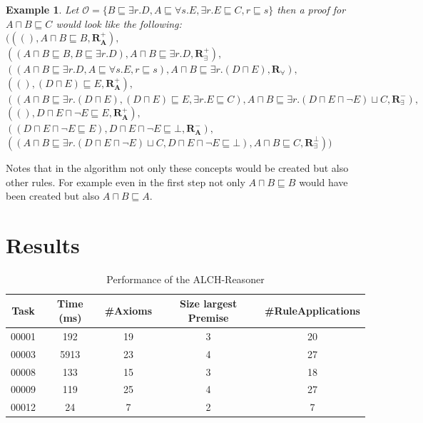 \documentclass[titlepage]{article}
\newtheorem{example}{Example}
\begin{document}
\begin{example}
  Let $\mathcal{O} = \{ B \sqsubseteq \exists r.D, A \sqsubseteq \forall s.E, \exists r.E \sqsubseteq C, r \sqsubseteq s\}$
  then a proof for $A \sqcap B \sqsubseteq C $ would look like the following: \\
    $(((),A \sqcap B \sqsubseteq B, \mathbf{R^+_A}),$ \\
    $((A \sqcap B \sqsubseteq B, B \sqsubseteq \exists r.D), A \sqcap B \sqsubseteq \exists r.D, \mathbf{R^+_{\exists}}), $ \\
    $((A \sqcap B \sqsubseteq \exists r.D, A \sqsubseteq \forall s.E, r \sqsubseteq s),A \sqcap B \sqsubseteq \exists r.(D \sqcap E), \mathbf{R_{\forall}}), $ \\
    $((),(D \sqcap E) \sqsubseteq E, \mathbf{R^+_A}),$ \\
    $((A \sqcap B \sqsubseteq \exists r.(D \sqcap E), (D \sqcap E) \sqsubseteq E, \exists r.E \sqsubseteq C), A \sqcap B \sqsubseteq \exists r.(D \sqcap E \sqcap \neg E) \sqcup C, \mathbf{R^-_{\exists}}),$ \\
    $((), D \sqcap E \sqcap \neg E \sqsubseteq E, \mathbf{R^+_A}), $ \\
    $((D \sqcap E \sqcap \neg E \sqsubseteq E),D \sqcap E \sqcap \neg E \sqsubseteq \bot, \mathbf{R^-_A}),$ \\
    $((A \sqcap B \sqsubseteq \exists r.(D \sqcap E \sqcap \neg E) \sqcup C, D \sqcap E \sqcap \neg E \sqsubseteq \bot), A \sqcap B \sqsubseteq C, \mathbf{R^{\bot}_{\exists}}))$
\end{example}
Notes that in the algorithm not only these concepts would be created but also other rules.
For example even in the first step not only $A \sqcap B \sqsubseteq B$ would have been created but also
$A \sqcap B \sqsubseteq A$.



\section{Results}



\begin{table}[h]
  \centering
  \begin{tabular}{|c|c|c|c|c|}
    \hline
    \textbf{Task} & \textbf{Time (ms)} & \textbf{\#Axioms} & \textbf{Size largest Premise} & \textbf{\#RuleApplications} \\
    \hline
    00001 & 192 & 19 & 3 & 20  \\
    00003 & 5913 & 23 & 4 & 27 \\
    00008 & 133 & 15 & 3 & 18  \\
    00009 & 119 & 25 & 4 & 27  \\
    00012 & 24 & 7 & 2 & 7  \\
    \hline
  \end{tabular}
  \caption{Performance of the ALCH-Reasoner}
  \label{tab:alch-performance} 
\end{table}
\end{document}
